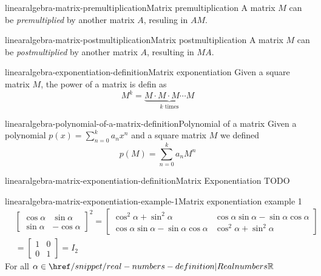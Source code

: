 \documentclass[preview]{standalone}
\begin{document}
\begin{snippetdefinition}{linearalgebra-matrix-premultiplication}{Matrix premultiplication}
    A matrix \(M\) can be \textit{premultiplied}
    by another matrix \(A\), resuling in \(AM\).
\end{snippetdefinition}

\begin{snippetdefinition}{linearalgebra-matrix-postmultiplication}{Matrix postmultiplication}
    A matrix \(M\) can be \textit{postmultiplied}
    by another matrix \(A\), resulting in \(MA\).
\end{snippetdefinition}

\begin{snippetdefinition}{linearalgebra-exponentiation-definition}{Matrix exponentiation}
    Given a square matrix \(M\), the power of a matrix
    is defin as
    \[
        M^k = \underbrace{M\cdot M \cdot M \cdots M}_{k \text{ times}}
    \]
\end{snippetdefinition}

\begin{snippetdefinition}{linearalgebra-polynomial-of-a-matrix-definition}{Polynomial of a matrix}
    Given a polynomial \(p(x)=\sum_{n=0}^k a_nx^n\)
    and a square matrix \(M\) we defined
    \[
        p(M) = \sum_{n=0}^k a_nM^n
    \]
\end{snippetdefinition}

\begin{snippetdefinition}{linearalgebra-matrix-exponentiation-definition}{Matrix Exponentiation}
    TODO
\end{snippetdefinition}

\begin{snippetexample}{linearalgebra-matrix-exponentiation-example-1}{Matrix exponentiation example 1}
    \begin{align*}
        & {\begin{bmatrix}
            \cos\alpha & \sin\alpha \\
            \sin\alpha & -\cos\alpha
        \end{bmatrix}}^2
        = \begin{bmatrix}
            \cos^2\alpha + \sin^2\alpha & \cos\alpha\sin\alpha - \sin\alpha\cos\alpha \\
            \cos\alpha\sin\alpha - \sin\alpha\cos\alpha & \cos^2\alpha + \sin^2\alpha
        \end{bmatrix}
        \\
        &= \begin{bmatrix}
            1 & 0 \\
            0 & 1
        \end{bmatrix} = I_2
    \end{align*}
    For all \(\alpha \in \realnumbers\)
\end{snippetexample}
\end{document}

